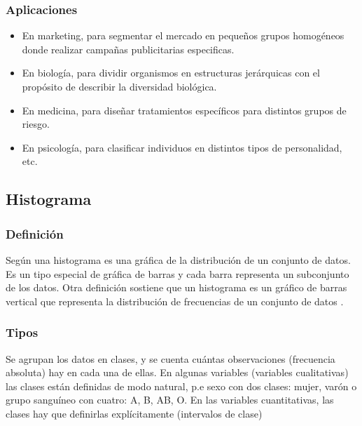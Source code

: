 \subsubsection{Aplicaciones}

\begin{itemize}
	\item En marketing, para segmentar el mercado en pequeños grupos homogéneos donde realizar campañas publicitarias especificas.
	\item En biología, para dividir organismos en estructuras jerárquicas con el propósito de describir la diversidad biológica.
	\item En medicina, para diseñar tratamientos específicos para distintos grupos de riesgo.
	\item En psicología, para clasificar individuos en distintos tipos de personalidad, etc.
\end{itemize}

\subsection{Histograma}

\subsubsection{Definición}

Según \citep{histograma_unam} una histograma es una gráfica de la distribución de un conjunto de datos. Es un tipo especial de gráfica de barras y cada barra representa un subconjunto de los datos. Otra definición sostiene que un histograma es un gráfico de barras vertical que representa la distribución de frecuencias de un conjunto de datos \citep{histograma_aiteco}.

\vskip 1cm 
\subsubsection{Tipos}
Se agrupan los datos en clases, y se cuenta cuántas observaciones (frecuencia absoluta) hay en cada una de ellas. En algunas variables (variables cualitativas) las clases están definidas de modo natural, p.e sexo con dos clases: mujer, varón o grupo sanguíneo con cuatro: A, B, AB, O. En las variables cuantitativas, las clases hay que definirlas explícitamente (intervalos de clase) \citep{histograma_tipos}

